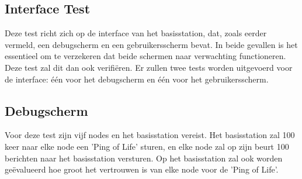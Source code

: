 \subsection{Interface Test}
Deze test richt zich op de interface van het basisstation, dat, zoals eerder vermeld, een debugscherm en een gebruikersscherm bevat. In beide gevallen is het essentieel om te verzekeren dat beide schermen naar verwachting functioneren. Deze test zal dit dan ook verifiëren. Er zullen twee tests worden uitgevoerd voor de interface: één voor het debugscherm en één voor het gebruikersscherm.

\subsection{Debugscherm}
Voor deze test zijn vijf nodes en het basisstation vereist. Het basisstation zal 100 keer naar elke node een 'Ping of Life' sturen, en elke node zal op zijn beurt 100 berichten naar het basisstation versturen. Op het basisstation zal ook worden geëvalueerd hoe groot het vertrouwen is van elke node voor de 'Ping of Life'.
